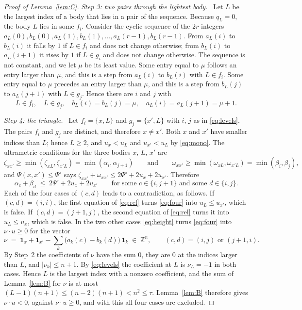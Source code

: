 \documentclass[11pt]{amsart}
\theoremstyle{definition}
\theoremstyle{remark}
\numberwithin{equation}{section}
\newcommand{\ZZ}{\mathbb{Z}}
\newcommand{\Po}{\Psi^{\circ}}
\newcommand{\one}[1]{\mathbf{1}_{#1}}
\newcommand{\step}[1]{\smallskip\noindent\textit{#1}\ }
\begin{document}
\begin{proof}[Proof of Lemma~\ref{lem:C}]
\step{Step 3: two pairs through the lightest body.} Let $L$ be the largest index of a body that lies in
a pair of the sequence. Because $q_L = 0$, the body $L$ lies in some $f_i$. Consider the cyclic sequence
of the $2r$ integers $a_L(0), b_L(0), a_L(1), b_L(1), \dots, a_L(r-1), b_L(r-1)$. From $a_L(i)$ to
$b_L(i)$ it falls by $1$ if $L \in f_i$ and does not change otherwise; from $b_L(i)$ to $a_L(i+1)$ it
rises by $1$ if $L \in g_i$ and does not change otherwise. The sequence is not constant, and we let $\mu$ be its least value. Some entry equal to $\mu$ follows an entry larger than $\mu$, and this is a step from $a_L(i)$
to $b_L(i)$ with $L \in f_i$. Some entry equal to $\mu$ precedes an entry larger than $\mu$, and this is
a step from $b_L(j)$ to $a_L(j+1)$ with $L \in g_j$. Hence there are $i$ and $j$ with
\begin{equation}\label{eq:levels}
  L \in f_i, \quad L \in g_j, \quad b_L(i) = b_L(j) = \mu, \quad a_L(i) = a_L(j + 1) = \mu + 1 .
\end{equation}

\step{Step 4: the triangle.} Let $f_i = \{x, L\}$ and $g_j = \{x', L\}$ with $i$, $j$ as in
\eqref{eq:levels}. The pairs $f_i$ and $g_j$ are distinct, and therefore $x \ne x'$. Both $x$ and $x'$
have smaller indices than $L$; hence $L \ge 2$, and $u_x < u_L$ and $u_{x'} < u_L$ by \eqref{eq:mono}.
The ultrametric conditions for the three bodies $x$, $L$, $x'$ are
\[
  \zeta_{xx'} \ge \min(\zeta_{xL}, \zeta_{x'L}) = \min(\alpha_i, \alpha_{j+1})
  \qquad\text{and}\qquad
  \omega_{xx'} \ge \min(\omega_{xL}, \omega_{x'L}) = \min(\beta_i, \beta_j) ,
\]
and $\Psi(x, x') \le \Po$ says $\zeta_{xx'} + \omega_{xx'} \le 2\Po + 2u_x + 2u_{x'}$. Therefore
\begin{equation}\label{eq:four}
  \alpha_c + \beta_d \;\le\; 2\Po + 2u_x + 2u_{x'}
  \qquad\text{for some } c \in \{i, j + 1\} \text{ and some } d \in \{i, j\} .
\end{equation}
Each of the four cases of $(c, d)$ leads to a contradiction, as follows. If $(c, d) = (i, i)$, the first equation of \eqref{eq:rel} turns \eqref{eq:four}
into $u_L \le u_{x'}$, which is false. If $(c, d) = (j + 1, j)$, the second equation of \eqref{eq:rel}
turns it into $u_L \le u_x$, which is false. In the two other cases \eqref{eq:height} turns
\eqref{eq:four} into $\nu \cdot u \ge 0$ for the vector
\[
  \nu \;=\; \one{x} + \one{x'} - \sum_k \bigl( a_k(c) - b_k(d) \bigr)\, \one{k} \;\in\; \ZZ^n ,
  \qquad (c, d) = (i, j) \text{ or } (j + 1, i) .
\]
By Step~2 the coefficients of $\nu$ have the sum $0$, they are $0$ at the indices larger than $L$, and
$|\nu_k| \le n + 1$. By \eqref{eq:levels} the coefficient at $L$ is $\nu_L = -1$ in both cases. Hence
$L$ is the largest index with a nonzero coefficient, and the sum of Lemma~\ref{lem:B} for $\nu$ is at
most $(L - 1)(n + 1) \le (n - 2)(n + 1) < n^2 \le \tau$. Lemma~\ref{lem:B} therefore gives $\nu \cdot u < 0$, against $\nu \cdot u \ge 0$, and with this all
four cases are excluded.
\end{proof}
\end{document}
